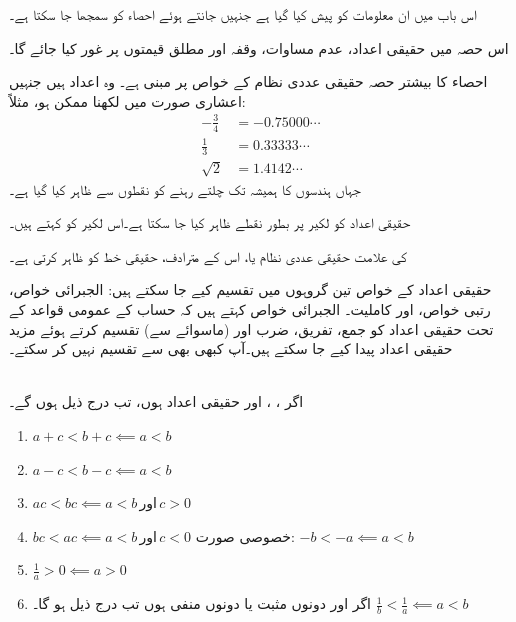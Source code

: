 
اس باب میں ان معلومات کو پیش کیا گیا ہے جنہیں جانتے ہوئے احصاء کو سمجھا جا سکتا ہے۔

اس حصہ میں حقیقی اعداد، عدم مساوات، وقفہ اور مطلق قیمتوں پر غور کیا جائے گا۔

احصاء کا بیشتر حصہ حقیقی عددی نظام کے خواص پر مبنی ہے۔ وہ اعداد ہیں جنہیں اعشاری صورت میں لکھنا ممکن ہو، مثلاً:
\begin{align*}
-\frac{3}{4}&=-0.75000\cdots\\
\frac{1}{3}&=0.33333\cdots\\
\sqrt{2}&=1.4142\cdots
\end{align*}
جہاں ہندسوں کا  ہمیشہ تک چلتے رہنے کو نقطوں  سے ظاہر کیا گیا ہے۔

حقیقی اعداد کو لکیر پر بطور نقطے ظاہر کیا جا سکتا ہے۔اس لکیر کو  کہتے ہیں۔
\begin{center}
\end{center}
 کی علامت حقیقی عددی نظام یا، اس کے مترادف، حقیقی خط کو ظاہر کرتی ہے۔

حقیقی اعداد کے خواص تین گروہوں میں تقسیم کیے جا سکتے ہیں: الجبرائی خواص، رتبی خواص، اور کاملیت۔ الجبرائی خواص کہتے ہیں کہ حساب کے عمومی قواعد کے تحت حقیقی اعداد کو جمع، تفریق، ضرب اور (ماسوائے  سے) تقسیم   کرتے ہوئے مزید حقیقی اعداد پیدا کیے جا سکتے ہیں۔آپ کبھی بھی  سے تقسیم نہیں کر سکتے۔

\\
اگر ، ،  اور  حقیقی اعداد ہوں، تب درج ذیل ہوں گے۔
\begin{enumerate}[1.]
\item
$a+c<b+c\impliedby a<b$
\item
$a-c<b-c\impliedby a<b$
\item
$ac<bc\impliedby a<b \,\text{اور}\, c>0$
\item
$bc<ac\impliedby a<b\, \text{اور}\, c<0$\quad 
خصوصی صورت:
$-b<-a\impliedby a<b$
\item
$\frac{1}{a}>0\impliedby a>0$
\item
اگر  اور  دونوں مثبت یا دونوں منفی ہوں تب  درج ذیل ہو گا۔
$\frac{1}{b}<\frac{1}{a}\impliedby a<b$
\end{enumerate}

